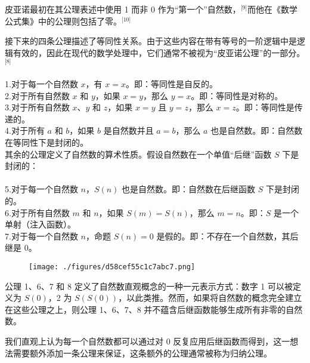 皮亚诺最初在其公理表述中使用 1 而非 0 作为“第一个”自然数，\(^\text{[9]}\)而他在《数学公式集》中的公理则包括了零。\(^\text{[10]}\)

接下来的四条公理描述了等同性关系。由于这些内容在带有等号的一阶逻辑中是逻辑有效的，因此在现代的数学处理中，它们通常不被视为“皮亚诺公理”的一部分。\(^\text{[8]}\)\\\\
1.对于每一个自然数 $x$，有 $x = x$。即：等同性是自反的。\\
2.对于所有自然数 $x$ 和 $y$，如果 $x = y$，那么 $y = x$。即：等同性是对称的。\\
3.对于所有自然数 $x$、$y$ 和 $z$，如果 $x = y$ 且 $y = z$，那么 $x = z$。即：等同性是传递的。\\
4.对于所有 $a$ 和 $b$，如果 $b$ 是自然数并且 $a = b$，那么 $a$ 也是自然数。即：自然数在等同性下是封闭的。\\

其余的公理定义了自然数的算术性质。假设自然数在一个单值“后继”函数 $S$ 下是封闭的：\\\\
5.对于每一个自然数 $n$，$S(n)$ 也是自然数。即：自然数在后继函数 $S$ 下是封闭的。\\
6.对于所有自然数 $m$ 和 $n$，如果 $S(m) = S(n)$，那么 $m = n$。即：$S$ 是一个单射（注入函数）。\\
7.对于每一个自然数 $n$，命题 $S(n) = 0$ 是假的。即：不存在一个自然数，其后继是 0。
\begin{figure}[ht]
\centering
\texttt{[image: ./figures/d58cef55c1c7abc7.png]}
\caption{} \label{fig_PYN_1}
\end{figure}
公理 1、6、7 和 8 定义了自然数直观概念的一种一元表示方式：数字 1 可以被定义为 $S(0)$，2 为 $S(S(0))$，以此类推。然而，如果将自然数的概念完全建立在这些公理之上，则公理 1、6、7、8 并不蕴含后继函数能够生成所有非零的自然数。

我们直观上认为每一个自然数都可以通过对 0 反复应用后继函数而得到，这一想法需要额外添加一条公理来保证，这条额外的公理通常被称为归纳公理。
